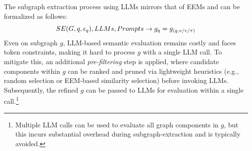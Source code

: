 {
The subgraph extraction process using LLMs mirrors that of EEMs and can be formalized as follows:
\begin{equation*}
\small
SE(G, q, \epsilon_q), LLMs, Prompts \rightarrow  g_q= g_{(q, v/e/\tau)}
\end{equation*}
Even on subgraph \( g \), LLM-based semantic evaluation remains costly and faces token constraints, making it hard to process $g$ with a single LLM call. To mitigate this, an additional \textit{pre-filtering} step is applied, where candidate components within $g$ can be ranked and pruned via lightweight heuristics (e.g., random selection or EEM-based similarity selection) before invoking LLMs.
Subsequently, the refined $g$ can be passed to LLMs for evaluation within a single call.\footnote{
Multiple LLM calls can be used to evaluate all graph components in \( g \), but this incurs substantial overhead during subgraph-extraction and is typically avoided.}




}
